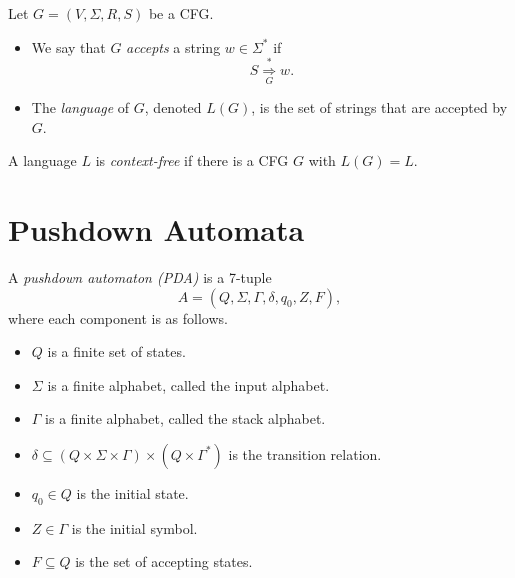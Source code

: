 \begin{definition}
  Let $G = (V, \Sigma, R, S)$ be a CFG.
  \begin{itemize}
    \item We say that $G$ \emph{accepts} a string $w \in \Sigma^*$ if
    \begin{equation*}
      S \mathrel{\mathop\Rightarrow\limits_G^*} w.
    \end{equation*}
    \item The \emph{language} of $G$, denoted $L(G)$, is the set of strings
    that are accepted by $G$.
  \end{itemize}
\end{definition}

\begin{definition}
  A language $L$ is \emph{context-free} if there is a CFG $G$ with $L(G) = L$.
\end{definition}

\section{Pushdown Automata}
\begin{definition}
  A \emph{pushdown automaton (PDA)} is a 7-tuple
  \begin{equation*}
    A = (Q, \Sigma, \Gamma, \delta, q_0, Z, F),
  \end{equation*}
  where each component is as follows.
  \begin{itemize}
    \item $Q$ is a finite set of states.
    \item $\Sigma$ is a finite alphabet, called the input alphabet.
    \item $\Gamma$ is a finite alphabet, called the stack alphabet.
    \item $\delta \subseteq (Q \times \Sigma \times \Gamma) \times
    (Q \times \Gamma^*)$ is the transition relation.
    \item $q_0 \in Q$ is the initial state.
    \item $Z \in \Gamma$ is the initial symbol.
    \item $F \subseteq Q$ is the set of accepting states.
  \end{itemize}
\end{definition}

